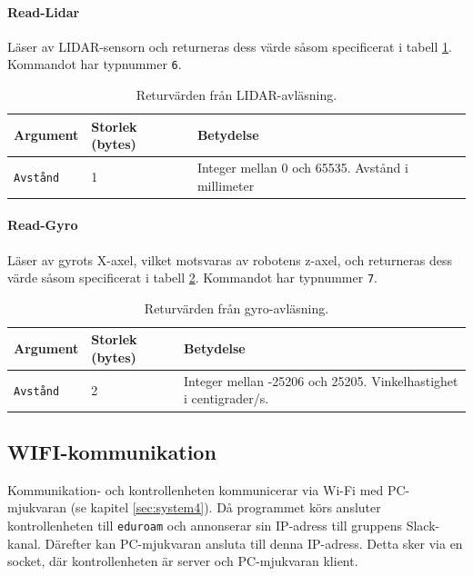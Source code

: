 \documentclass[a4paper,11pt]{article}
\begin{document}
\paragraph{Read-Lidar}
Läser av LIDAR-sensorn och returneras dess värde såsom specificerat i tabell \ref{tab:lidar}. Kommandot har typnummer \texttt{6}.
\begin{table}[h!]
    \centering
    \begin{tabular}{|l|l|l|}
    \rowcolor{gray!50}
        \hline
        \textbf{Argument} & \textbf{Storlek (bytes)} & \textbf{Betydelse} \\ \hline
        \texttt{Avstånd} & 1 & Integer mellan 0 och 65535. Avstånd i millimeter \\ \hline
        \end{tabular}
    \caption{Returvärden från LIDAR-avläsning.}
    \label{tab:lidar}
\end{table}


\paragraph{Read-Gyro}
Läser av gyrots X-axel, vilket motsvaras av robotens z-axel, och returneras dess värde såsom specificerat i tabell \ref{tab:gyro}. Kommandot har typnummer \texttt{7}.
\begin{table}[h!]
    \centering
    \begin{tabular}{|l|l|l|}
    \rowcolor{gray!50}
        \hline
        \textbf{Argument} & \textbf{Storlek (bytes)} & \textbf{Betydelse} \\ \hline
        \texttt{Avstånd} & 2 & Integer mellan -25206 och 25205. Vinkelhastighet i centigrader/s. \\ \hline
    \end{tabular}
    \caption{Returvärden från gyro-avläsning.}
    \label{tab:gyro}
\end{table}

\subsection{WIFI-kommunikation}
Kommunikation- och kontrollenheten kommunicerar via Wi-Fi med PC-mjukvaran (se kapitel \ref{sec:system4}). Då programmet körs ansluter kontrollenheten till \texttt{eduroam} och annonserar sin IP-adress till gruppens Slack-kanal. Därefter kan PC-mjukvaran ansluta till denna IP-adress. Detta sker via en socket, där kontrollenheten är server och PC-mjukvaran klient.
\end{document}
